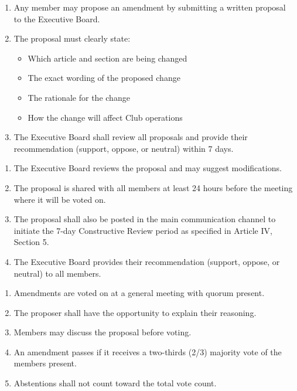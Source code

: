 
\begin{enumerate}[label=\alph*), leftmargin=2em, itemsep=0.3em]
    \item Any member may propose an amendment by submitting a written proposal to the Executive Board.
    
    \item The proposal must clearly state:
    \begin{itemize}[leftmargin=1.5em, itemsep=0.2em]
        \item Which article and section are being changed
        \item The exact wording of the proposed change
        \item The rationale for the change
        \item How the change will affect Club operations
    \end{itemize}
    
    \item The Executive Board shall review all proposals and provide their recommendation (support, oppose, or neutral) within 7 days.
\end{enumerate}


\begin{enumerate}[label=\alph*), leftmargin=2em, itemsep=0.3em]
    \item The Executive Board reviews the proposal and may suggest modifications.
    
    \item The proposal is shared with all members at least 24 hours before the meeting where it will be voted on.
    
    \item The proposal shall also be posted in the main communication channel to initiate the 7-day Constructive Review period as specified in Article IV, Section 5.
    
    \item The Executive Board provides their recommendation (support, oppose, or neutral) to all members.
\end{enumerate}


\begin{enumerate}[label=\alph*), leftmargin=2em, itemsep=0.3em]
    \item Amendments are voted on at a general meeting with quorum present.
    
    \item The proposer shall have the opportunity to explain their reasoning.
    
    \item Members may discuss the proposal before voting.
    
    \item An amendment passes if it receives a two-thirds (2/3) majority vote of the members present.
    
    \item Abstentions shall not count toward the total vote count.
\end{enumerate}

